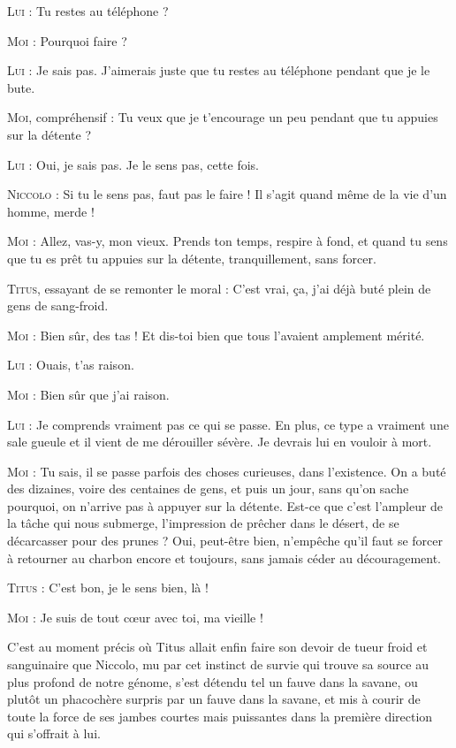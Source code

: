 \begin{dialogue}
\textsc{Lui} : Tu restes au téléphone ?

\textsc{Moi} : Pourquoi faire ?

\textsc{Lui} : Je sais pas. J’aimerais juste que tu restes au téléphone pendant que je le bute.

\textsc{Moi}, compréhensif : Tu veux que je t’encourage un peu pendant que tu appuies sur la détente ?

\textsc{Lui} : Oui, je sais pas. Je le sens pas, cette fois.

\textsc{Niccolo} : Si tu le sens pas, faut pas le faire ! Il s’agit quand même de la vie d’un homme, merde !

\textsc{Moi} : Allez, vas-y, mon vieux. Prends ton temps, respire à fond, et quand tu sens que tu es prêt tu appuies sur la détente, tranquillement, sans forcer.

\textsc{Titus}, essayant de se remonter le moral : C’est vrai, ça, j’ai déjà buté plein de gens de sang-froid.

\textsc{Moi} : Bien sûr, des tas ! Et dis-toi bien que tous l’avaient amplement mérité.

\textsc{Lui} : Ouais, t’as raison.

\textsc{Moi} : Bien sûr que j’ai raison.

\textsc{Lui} : Je comprends vraiment pas ce qui se passe. En plus, ce type a vraiment une sale gueule et il vient de me dérouiller sévère. Je devrais lui en vouloir à mort.

\textsc{Moi} : Tu sais, il se passe parfois des choses curieuses, dans l’existence. On a buté des dizaines, voire des centaines de gens, et puis un jour, sans qu’on sache pourquoi, on n’arrive pas à appuyer sur la détente. Est-ce que c’est l’ampleur de la tâche qui nous submerge, l’impression de prêcher dans le désert, de se décarcasser pour des prunes ? Oui, peut-être bien, n’empêche qu’il faut se forcer à retourner au charbon encore et toujours, sans jamais céder au découragement.

\textsc{Titus} : C’est bon, je le sens bien, là !

\textsc{Moi} : Je suis de tout cœur avec toi, ma vieille !

\end{dialogue}

C’est au moment précis où Titus allait enfin faire son devoir de tueur froid et sanguinaire que Niccolo, mu par cet instinct de survie qui trouve sa source au plus profond de notre génome, s’est détendu tel un fauve dans la savane, ou plutôt un phacochère surpris par un fauve dans la savane, et mis à courir de toute la force de ses jambes courtes mais puissantes dans la première direction qui s’offrait à lui.

